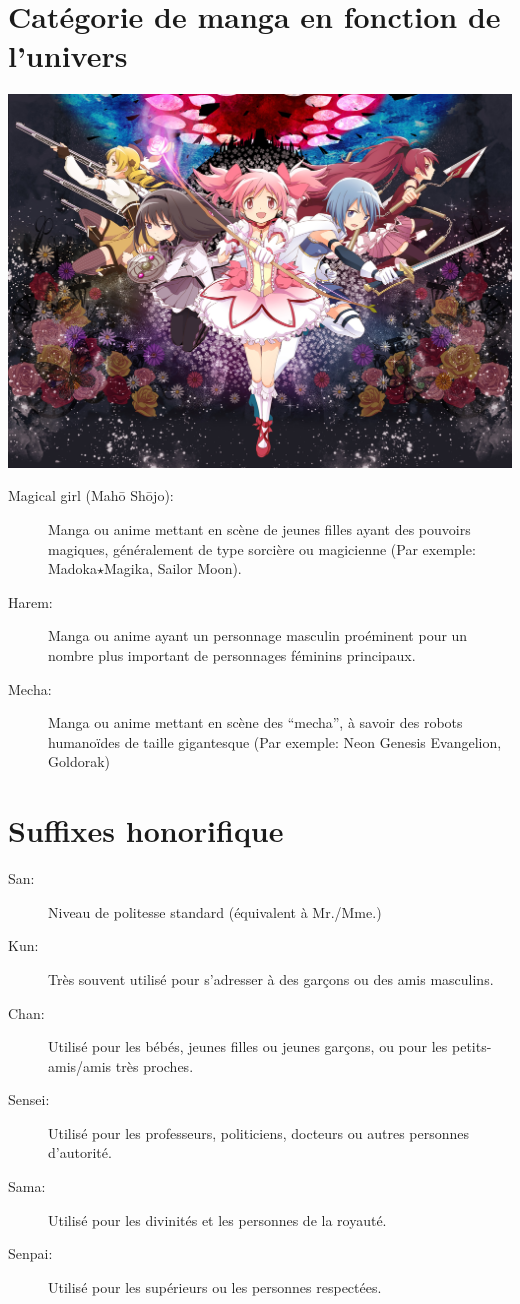 \section{Catégorie de manga en fonction de l'univers}

\begin{center}
	\includegraphics[scale=0.8]{Madoka.jpg}
\end{center}

\begin{description}
	\item[Magical girl (Mah\=o Sh\=ojo):] Manga ou anime mettant en scène de
		jeunes filles ayant des pouvoirs magiques, généralement de type
		sorcière ou magicienne (Par exemple: Madoka$\star$Magika, Sailor Moon).
	\item[Harem:] Manga ou anime ayant un personnage masculin proéminent pour
		un nombre plus important de personnages féminins principaux.
	\item[Mecha:] Manga ou anime mettant en scène des ``mecha'', à savoir des
		robots humanoïdes de taille gigantesque (Par exemple: Neon Genesis
		Evangelion, Goldorak)
\end{description}

\section{Suffixes honorifique}

\begin{description}
	\item[San:] Niveau de politesse standard (équivalent à Mr./Mme.)
	\item[Kun:] Très souvent utilisé pour s'adresser à des garçons ou des amis
		masculins.
	\item[Chan:] Utilisé pour les bébés, jeunes filles ou jeunes garçons, ou
		pour les petits-amis/amis très proches.
	\item[Sensei:] Utilisé pour les professeurs, politiciens, docteurs ou
		autres personnes d'autorité.
	\item[Sama:] Utilisé pour les divinités et les personnes de la royauté.
	\item[Senpai:] Utilisé pour les supérieurs ou les personnes respectées.
\end{description}

